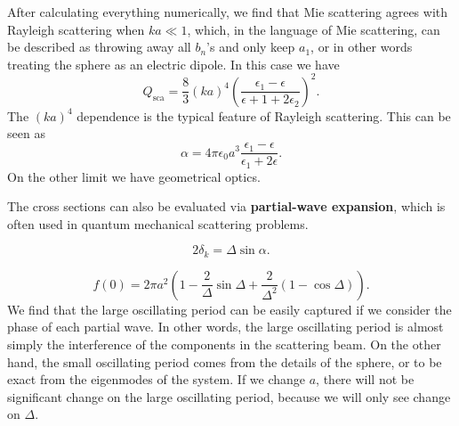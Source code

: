 \documentclass[hyperref, a4paper]{article}
\newcommand*{\concept}[1]{{\textbf{#1}}}
\begin{document}
After calculating everything numerically, we find that Mie scattering agrees with Rayleigh scattering when 
$k a \ll 1$, which, in the language of Mie scattering, can be described as throwing away all $b_n$'s and only 
keep $a_1$, or in other words treating the sphere as an electric dipole. In this case we have 
\begin{equation}
    Q_\text{sca} = \frac{8}{3} (ka)^4 \left(\frac{\epsilon_1 - \epsilon}{\epsilon+1 + 2 \epsilon_2}\right)^2.
\end{equation}
The $(ka)^4$ dependence is the typical feature of Rayleigh scattering. This can be seen as 
\begin{equation}
    \alpha = 4 \pi \epsilon_0 a^3 \frac{\epsilon_1 - \epsilon}{\epsilon_1 + 2 \epsilon}.
\end{equation}
On the other limit we have geometrical optics. 

The cross sections can also be evaluated via \concept{partial-wave expansion}, which is often used in 
quantum mechanical scattering problems. 

\begin{equation}
    2 \delta_k = \Delta \sin \alpha.
\end{equation}

\begin{equation}
    f(0) = 2 \pi a^2 \left( 1 - \frac{2}{\Delta} \sin \Delta + \frac{2}{\Delta^2} (1 - \cos \Delta) \right).
\end{equation}
We find that the large oscillating period can be easily captured if we consider the phase of each partial 
wave. In other words, the large oscillating period is almost simply the interference of the components in 
the scattering beam. On the other hand, the small oscillating period comes from the details of the sphere, 
or to be exact from the eigenmodes of the system. If we change $a$, there will not be significant change 
on the large oscillating period, because we will only see change on $\Delta$. 
\end{document}
